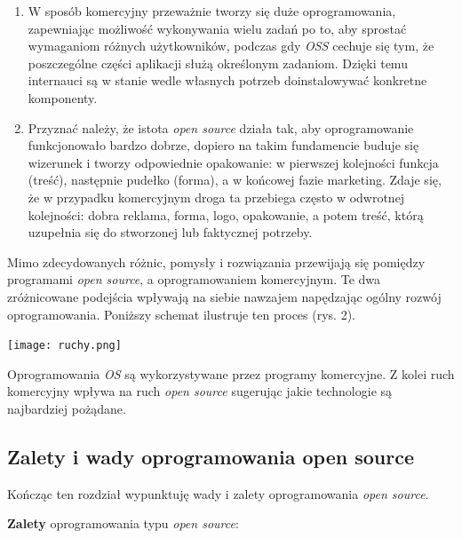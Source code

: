 \documentclass{article}
\begin{document}
\begin{enumerate}
    \item W sposób komercyjny przeważnie tworzy się duże oprogramowania, zapewniając możliwość wykonywania wielu zadań po to, aby sprostać wymaganiom różnych użytkowników, podczas gdy \emph{OSS} cechuje się tym, że poszczególne części aplikacji służą określonym zadaniom. Dzięki temu internauci są w stanie wedle własnych potrzeb doinstalowywać konkretne komponenty\cite{Kotula}.
    
    \item Przyznać należy, że istota \emph{open source} działa tak, aby oprogramowanie funkcjonowało bardzo dobrze, dopiero na takim fundamencie buduje się wizerunek i tworzy odpowiednie opakowanie: w pierwszej kolejności funkcja (treść), następnie pudełko (forma), a w końcowej fazie marketing. Zdaje się, że w przypadku komercyjnym droga ta przebiega często w odwrotnej kolejności: dobra reklama, forma, logo, opakowanie, a potem treść, którą uzupełnia się do stworzonej lub faktycznej potrzeby\cite{Kotula}.
    \end{enumerate}
    
    Mimo zdecydowanych różnic, pomysły i rozwiązania przewijają się pomiędzy programami \emph{open source}, a oprogramowaniem komercyjnym. Te dwa zróżnicowane podejścia wpływają na siebie nawzajem napędzając ogólny rozwój oprogramowania. Poniższy schemat ilustruje ten proces (rys. 2).
    \begin{center}
        \texttt{[image: ruchy.png]}
    \end{center}
    \hspace{4mm} Oprogramowania \emph{OS} są wykorzystywane przez programy komercyjne. Z kolei ruch komercyjny wpływa na ruch \emph{open source} sugerując jakie technologie są najbardziej pożądane.

\subsection{Zalety i wady oprogramowania open source}

\hspace{4mm} Kończąc ten rozdział wypunktuję wady i zalety oprogramowania \emph{open source}. \newline

\textbf{Zalety} oprogramowania typu \emph{open source}:
\end{document}
